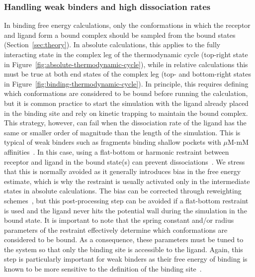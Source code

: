 \documentclass[9pt,bestpractices]{livecoms}
\begin{document}
\subsubsection{Handling weak binders and high dissociation rates}
In binding free energy calculations, only the conformations in which the receptor and ligand form a bound complex should be sampled from the bound states (Section~\ref{sec:theory}).
In absolute calculations, this applies to the fully interacting state in the complex leg of the thermodynamic cycle (top-right state in Figure~\ref{fig:absolute-thermodynamic-cycle}), while in relative calculations this must be true at both end states of the complex leg (top- and bottom-right states in Figure~\ref{fig:binding-thermodynamic-cycle}).
In principle, this requires defining which conformations are considered to be bound before running the calculation, but it is common practice to start the simulation with the ligand already placed in the binding site and rely on kinetic trapping to maintain the bound complex.
This strategy, however, can fail when the dissociation rate of the ligand has the same or smaller order of magnitude than the length of the simulation.
This is typical of weak binders such as fragments binding shallow pockets with $\mu$M-mM affinities~\cite{georgiou_pushing_2017,pan2017quantitative}.
In this case, using a flat-bottom or harmonic restraint between receptor and ligand in the bound state(s) can prevent dissociations~\cite{georgiou_pushing_2017,rizzi2019sampl6}.
We stress that this is normally avoided as it generally introduces bias in the free energy estimate, which is why the restraint is usually activated only in the intermediate states in absolute calculations.
The bias can be corrected through reweighting schemes~\cite{rizzi2019sampl6}, but this post-processing step can be avoided if a flat-bottom restraint is used and the ligand never hits the potential wall during the simulation in the bound state.
It is important to note that the spring constant and/or radius parameters of the restraint effectively determine which conformations are considered to be bound.
As a consequence, these parameters must be tuned to the system so that only the binding site is accessible to the ligand.
Again, this step is particularly important for weak binders as their free energy of binding is known to be more sensitive to the definition of the binding site~\cite{gilson1997statisticalthermodynamic}.
\end{document}
